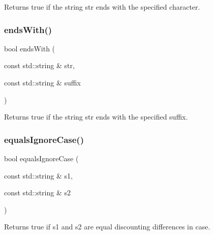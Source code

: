 Returns {\ttfamily true} if the string {\ttfamily str} ends with the specified character. 

\mbox{\label{namespacesgl_1_1priv_1_1strlib_a713373507ec8485d5466e3f4fcdaefa1}} 
\subsubsection{\texorpdfstring{ends\+With()}{endsWith()}\hspace{0.1cm}{\footnotesize\ttfamily [2/2]}}
{\footnotesize\ttfamily bool ends\+With (\begin{DoxyParamCaption}\item[{const std\+::string \&}]{str,  }\item[{const std\+::string \&}]{suffix }\end{DoxyParamCaption})}



Returns {\ttfamily true} if the string {\ttfamily str} ends with the specified suffix. 

\mbox{\label{namespacesgl_1_1priv_1_1strlib_a4aad54fd1c2e01c5d3e243aecf4a4e1e}} 
\subsubsection{\texorpdfstring{equals\+Ignore\+Case()}{equalsIgnoreCase()}}
{\footnotesize\ttfamily bool equals\+Ignore\+Case (\begin{DoxyParamCaption}\item[{const std\+::string \&}]{s1,  }\item[{const std\+::string \&}]{s2 }\end{DoxyParamCaption})}



Returns {\ttfamily true} if {\ttfamily s1} and {\ttfamily s2} are equal discounting differences in case. 

\mbox{\label{namespacesgl_1_1priv_1_1strlib_a166b00da7243e2a911bffeafceeab62d}} 
